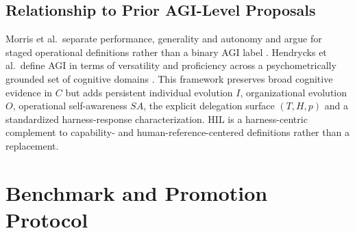 \documentclass[11pt]{article}
\theoremstyle{definition}
\begin{document}
\subsection{Relationship to Prior AGI-Level Proposals}

Morris et al.\ separate performance, generality and autonomy and argue for staged operational definitions rather than a binary AGI label \citep{morris2024levels}. Hendrycks et al.\ define AGI in terms of versatility and proficiency across a psychometrically grounded set of cognitive domains \citep{hendrycks2025agi}. This framework preserves broad cognitive evidence in $C$ but adds persistent individual evolution $I$, organizational evolution $O$, operational self-awareness $SA$, the explicit delegation surface $(T,H,p)$ and a standardized harness-response characterization. HIL is a harness-centric complement to capability- and human-reference-centered definitions rather than a replacement.

\section{Benchmark and Promotion Protocol}\label{sec:protocol}
\end{document}
